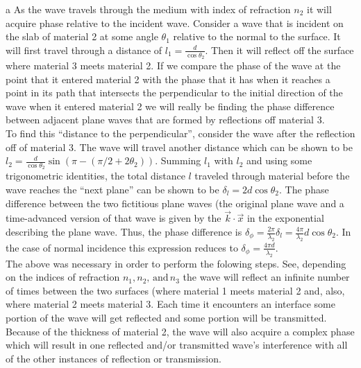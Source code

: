 \begin{homeworkProblem}
\begin{homeworkSection}{a}
As the wave travels through the medium with index of refraction $n_2$ it will acquire phase 
relative to the incident wave. Consider a wave that is incident on the slab of material 2 
at some angle $\theta_1$ relative to the normal to the surface. It will first travel through 
a distance of $l_1 = \frac{d}{\cos\theta_2}$. Then it will reflect off the surface where 
material 3 meets material 2. If we compare the phase of the wave at the point that it 
entered material 2 with the phase that it has when it reaches a point in its path that 
intersects the perpendicular to the initial direction of the wave when it entered material 
2 we will really be finding the phase difference between adjacent plane waves that are 
formed by reflections off material 3.
\\

To find this ``distance to the perpendicular'', consider the wave after the reflection off of 
material 3. The wave will travel another distance which can be shown to be 
$l_2 = \frac{d}{\cos\theta_2}\sin(\pi-(\pi/2+2\theta_2))$. Summing $l_1$ with $l_2$ and using 
some trigonometric identities, the total distance $l$ traveled through material before the 
wave reaches the ``next plane'' can be shown to be $\delta_l = 2d\cos\theta_2$. The phase 
difference between the two fictitious plane waves (the original plane wave and a time-advanced 
version of that wave is given by the $\vec{k}\cdot\vec{x}$ in the exponential describing the 
plane wave. Thus, the phase difference is $\delta_{\phi} = \frac{2\pi}{\lambda_2}\delta_l = 
\frac{4\pi}{\lambda_2}d \cos\theta_2$. In the case of normal incidence this expression 
reduces to $\delta_{\phi} = \frac{4\pi d}{\lambda_2}$.
\\

The above was necessary in order to perform the folowing steps. See, depending on the indices 
of refraction $n_1, n_2, \,\text{and}\, n_3$ the wave will reflect an infinite number of times 
between the two surfaces (where material 1 meets material 2 and, also, where material 2 
meets material 3. Each time it encounters an interface some portion of the wave will get 
reflected and some portion will be transmitted. Because of the thickness of material 2, the 
wave will also acquire a complex phase which will result in one reflected and/or transmitted 
wave's interference with all of the other instances of reflection or transmission.
\\


\end{homeworkSection}
\end{homeworkProblem}
